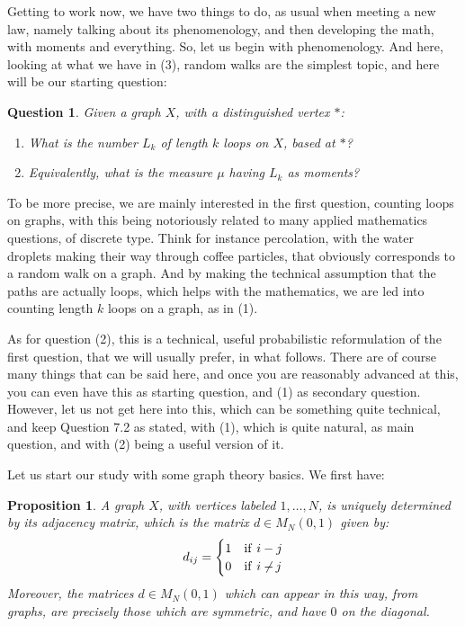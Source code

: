 \documentclass[12pt]{amsbook}
\newtheorem{proposition}[theorem]{Proposition}
\newtheorem{question}[theorem]{Question}
\begin{document}
\bigskip

Getting to work now, we have two things to do, as usual when meeting a new law, namely talking about its phenomenology, and then developing the math, with moments and everything. So, let us begin with phenomenology. And here, looking at what we have in (3), random walks are the simplest topic, and here will be our starting question:

\begin{question}
Given a graph $X$, with a distinguished vertex $*$:
\begin{enumerate}
\item What is the number $L_k$ of length $k$ loops on $X$, based at $*$? 

\item Equivalently, what is the measure $\mu$ having $L_k$ as moments?
\end{enumerate}
\end{question}

To be more precise, we are mainly interested in the first question, counting loops on graphs, with this being notoriously related to many applied mathematics questions, of discrete type. Think for instance percolation, with the water droplets making their way through coffee particles, that obviously corresponds to a random walk on a graph. And by making the technical assumption that the paths are actually loops, which helps with the mathematics, we are led into counting length $k$ loops on a graph, as in (1). 

\bigskip

As for question (2), this is a technical, useful probabilistic reformulation of the first question, that we will usually prefer, in what follows. There are of course many things that can be said here, and once you are reasonably advanced at this, you can even have this as starting question, and (1) as secondary question. However, let us not get here into this, which can be something quite technical, and keep Question 7.2 as stated, with (1), which is quite natural, as main question, and with (2) being a useful version of it.

\bigskip

Let us start our study with some graph theory basics. We first have:


\begin{proposition}
A graph $X$, with vertices labeled $1,\ldots,N$, is uniquely determined by its adjacency matrix, which is the matrix $d\in M_N(0,1)$ given by:
$$d_{ij}=\begin{cases}
1&{\rm if}\ i-j\\
0&{\rm if}\ {i\not\!\!-\,j}
\end{cases}$$
Moreover, the matrices $d\in M_N(0,1)$ which can appear in this way, from graphs, are precisely those which are symmetric, and have $0$ on the diagonal.
\end{proposition}
\end{document}
